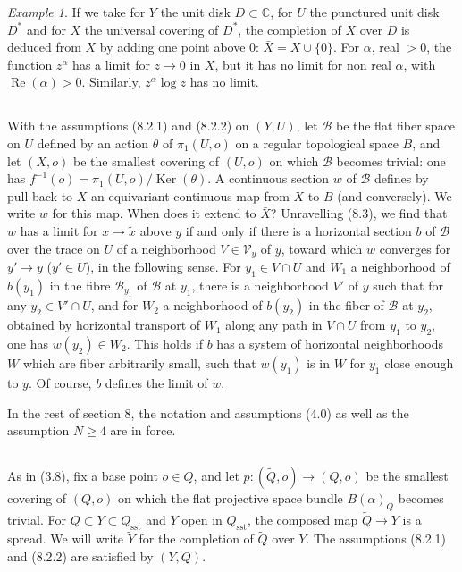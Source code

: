 \documentclass[12pt,a4paper]{article}
\theoremstyle{plain}
\theoremstyle{definition}
\theoremstyle{remark}
\newtheorem{example}[theorem]{Example}
\newcommand{\CC}{\mathbb{C}}
\numberwithin{equation}{section}
\providecommand{\CC}{\mathbb{C}}
\providecommand{\Ker}{\operatorname{Ker}}
\providecommand{\re}{\operatorname{Re}}
\begin{document}
\begin{example}\label{ex:8.4}
If we take for $Y$ the unit disk $D \subset \CC$, for $U$ the punctured unit disk $D^*$ and for $X$ the universal covering of $D^*$, the completion of $X$ over $D$ is deduced from $X$ by adding one point above $0$: $\bar{X} = X \cup \{0\}$. For $\alpha$, real $> 0$, the function $z^\alpha$ has a limit for $z \to 0$ in $X$, but it has no limit for non real $\alpha$, with $\re(\alpha) > 0$. Similarly, $z^\alpha \log z$ has no limit.
\end{example}

\subsection{}
With the assumptions (8.2.1) and (8.2.2) on $(Y, U)$, let $\mathscr{B}$ be the flat fiber space on $U$ defined by an action $\theta$ of $\pi_1(U, o)$ on a regular topological space $B$, and let $(X, o)$ be the smallest covering of $(U, o)$ on which $\mathscr{B}$ becomes trivial: one has $f^{-1}(o) = \pi_1(U, o)/\Ker(\theta)$. A continuous section $w$ of $\mathscr{B}$ defines by pull-back to $X$ an equivariant continuous map from $X$ to $B$ (and conversely). We write $w$ for this map. When does it extend to $\bar{X}$? Unravelling (8.3), we find that $w$ has a limit for $x \to \tilde{x}$ above $y$ if and only if there is a horizontal section $b$ of $\mathscr{B}$ over the trace on $U$ of a neighborhood $V \in \mathscr{V}_y$ of $y$, toward which $w$ converges for $y' \to y$ ($y' \in U$), in the following sense. For $y_1 \in V \cap U$ and $W_1$ a neighborhood of $b(y_1)$ in the fibre $\mathscr{B}_{y_1}$ of $\mathscr{B}$ at $y_1$, there is a neighborhood $V'$ of $y$ such that for any $y_2 \in V' \cap U$, and for $W_2$ a neighborhood of $b(y_2)$ in the fiber of $\mathscr{B}$ at $y_2$, obtained by horizontal transport of $W_1$ along any path in $V \cap U$ from $y_1$ to $y_2$, one has $w(y_2) \in W_2$. This holds if $b$ has a system of horizontal neighborhoods $W$ which are fiber arbitrarily small, such that $w(y_1)$ is in $W$ for $y_1$ close enough to $y$. Of course, $b$ defines the limit of $w$.

In the rest of section 8, the notation and assumptions (4.0) as well as the assumption $N \geq 4$ are in force.

\subsection{}
As in (3.8), fix a base point $o \in Q$, and let $p: (\widetilde{Q}, o) \to (Q, o)$ be the smallest covering of $(Q, o)$ on which the flat projective space bundle $B(\alpha)_Q$ becomes trivial. For $Q \subset Y \subset Q_{\mathrm{sst}}$ and $Y$ open in $Q_{\mathrm{sst}}$, the composed map $\widetilde{Q} \to Y$ is a spread. We will write $\widetilde{Y}$ for the completion of $\widetilde{Q}$ over $Y$. The assumptions (8.2.1) and (8.2.2) are satisfied by $(Y, Q)$.
\end{document}
